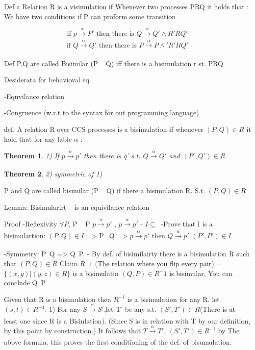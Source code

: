 \documentclass[a4paper,10pt,titlepage]{report}
\newtheorem{theorem}{Theorem}
\begin{document}
		     
Def a Relation R is a visimulation if
Whenever two processes PRQ it holds that :
We have two conditions
	if P can proform some transition 

	\begin{equation}
		\text{if } p  \xrightarrow[\text{}]{{ \alpha }} P' \text{ then there is } Q  \xrightarrow[\text{}]{{ \alpha }} Q' \wedge R'RQ'
	\end{equation}
	\begin{equation}
	\text{if }Q  \xrightarrow[\text{}]{{ \alpha }} Q' \text{ then there is } P  \xrightarrow[\text{}]{{ \alpha }} P \wedge ' R'RQ'
	\end{equation}


Def P,Q are called Bisimilar (P ~ Q) iff there is a bisimulation r st. PRQ


Desiderata for behavioval eq.

-Equvilance relation

-Congruence (w.r.t to the syntax for out programming language)

def. A relation R over CCS processes is a bisimulation if whenever $(P,Q) \in R$ it hold that for any lable $\alpha$ :
\begin{theorem}
1) If $p \xrightarrow[\text{}]{{ \alpha}} p'$ then there is q' s.t. $Q \xrightarrow[\text{}]{{ \alpha}} Q'$ and $(P',Q') \in R$
\end{theorem}
\begin{theorem}
2) symmetric of 1)
\end{theorem}





P and Q are called bisimilar (P ~ Q) if there a bisimulation R. S.t. $(P, Q) \in R$


Lemma: Bisimularirt ~ is an equivilance relation

Proof
	-Reflexivity $\forall P$, P ~ P $p \xrightarrow[\text{}]{{ {\alpha} }} p'$ , $p \xrightarrow[\text{}]{{ {\alpha} }} p'$
		-	$I \subseteq ~$
		-Prove that I is a bisimulartion: $(P,Q) \in I$ => P=Q => $p \xrightarrow[\text{}]{{ {\alpha} }} p'$ then $Q \xrightarrow[\text{}]{{ {\alpha} }} p'$  $(P',P') \in I $
		
	-Symmetry:
		P~Q => Q~P.
			- By def. of bisimilairty there is a bisimulation R such that $(P,Q) \in R$
				Claim $R^-1$ (The relation where you flip every pair) = $\{(x,y)|(y,z) \in R\}$ is a bisimulatin
					$(Q,P) \in R^-1$ is bisimular, You can conclude Q~P
					

Given that R is a bisimulation then $R^{-1}$ is a bisimulation for any R.
let $(s,t) \in R^{-1}$. 
1) For any $S \xrightarrow[\text{}]{{ {\alpha} }} S'$,let T' be any s.t. $(S',T') \in R $(There is at least one since R is a Bisiulation).
	(Since S is in relation with T by our definition, by this point by construction.)
	It follows that $T \xrightarrow[\text{}]{{ {\alpha} }} T'$, $(S',T') \in R^{-1}$ by The above formula. this proves the first conditioning of the def. of bisumulation.
\end{document}
